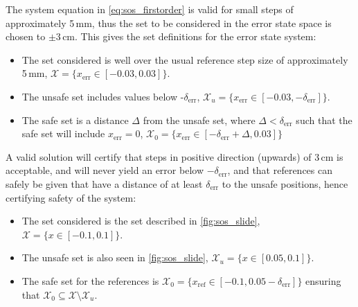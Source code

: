 The system equation in \autoref{eq:sos_firstorder} is valid for small steps of approximately 5\,mm, thus the set to be considered in the error state space is chosen to $\pm 3$\,cm. This gives the set definitions for the error state system:
\vspace{-3mm}
\begin{itemize}
\itemsep-0.7mm
\item The set considered is well over the usual reference step size of approximately 5\,mm, $\mathcal{X}=\{x_\text{err}\in[-0.03,0.03] \}$.
\item The unsafe set includes values below -$\delta_\text{err}$, $\mathcal{X}_u=\{x_\text{err}\in [-0.03,-\delta_\text{err}] \}$.
\item The safe set is a distance $\Delta$ from the unsafe set, where $\Delta<\delta_\text{err}$ such that the safe set will include $x_\text{err}=0$, $\mathcal{X}_0=\{x_\text{err}\in [-\delta_\text{err}+\Delta,0.03] \}$
\end{itemize}

A valid solution will certify that steps in positive direction (upwards) of 3\,cm is acceptable, and will never yield an error below $-\delta_\text{err}$, and that references can safely be given that have a distance of at least $\delta_\text{err}$ to the unsafe positions, hence certifying safety of the system: %
\vspace{-3mm}
\begin{itemize}
	\itemsep-0.7mm
	\item The set considered is the set described in \autoref{fig:sos_slide}, $\mathcal{X}=\{x\in[-0.1,0.1] \}$.
	\item The unsafe set is also seen in \autoref{fig:sos_slide}, $\mathcal{X}_u=\{x\in [0.05,0.1] \}$.
	\item The safe set for the references is $\mathcal{X}_0=\{x_\text{ref}\in [-0.1,0.05-\delta_\text{err}] \}$ ensuring that $\mathcal{X}_0\subseteq\mathcal{X}\setminus\mathcal{X}_u$.
\end{itemize}

